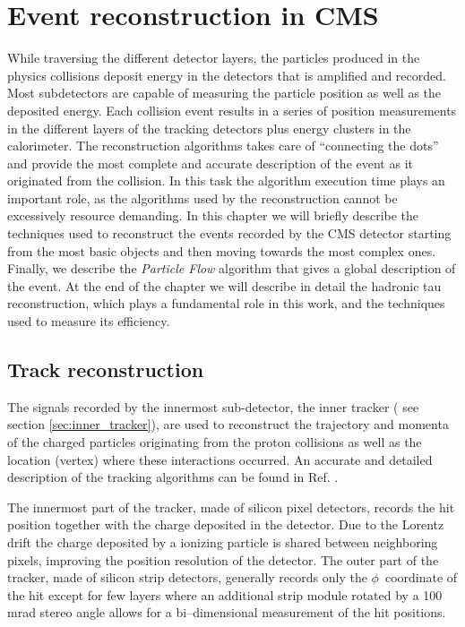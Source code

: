 \chapter{Event reconstruction in CMS}

While traversing the different detector layers, the particles produced in the physics collisions deposit energy in the detectors that is amplified and recorded. Most subdetectors are capable of measuring the particle position as well as the deposited energy. Each collision event results in a series of position measurements in the different layers of the tracking detectors plus energy clusters in the calorimeter. The reconstruction algorithms takes care of ``connecting the dots'' and provide the most complete and accurate description of the event as it originated from the collision. In this task the algorithm execution time plays an important role, as the algorithms used by the reconstruction cannot be excessively resource demanding. In this chapter we will briefly describe the techniques used to reconstruct the events recorded by the CMS detector starting from the most basic objects and then moving towards the most complex ones. Finally, we describe the \emph{Particle Flow} algorithm that gives a global description of the event. At the end of the chapter we will describe in detail the hadronic tau reconstruction, which plays a fundamental role in this work, and the techniques used to measure its efficiency.

\section{Track reconstruction}

The signals recorded by the innermost sub-detector, the inner tracker ( see section \ref{sec:inner_tracker}), are used to reconstruct the trajectory and momenta of the charged particles originating from the proton collisions as well as the location (vertex) where these interactions occurred. An accurate and detailed description of the tracking algorithms can be found in Ref. \cite{cms_trk_11_01}.

The innermost part of the tracker, made of silicon pixel detectors, records the hit position together with the charge deposited in the detector. Due to the Lorentz drift the charge deposited by a ionizing particle is shared between neighboring pixels, improving the position resolution of the detector. The outer part of the tracker, made of silicon strip detectors, generally records only the $\phi$\ coordinate of the hit except for few layers where an additional strip module rotated by a 100 mrad stereo angle allows for a bi--dimensional measurement of the hit positions.

